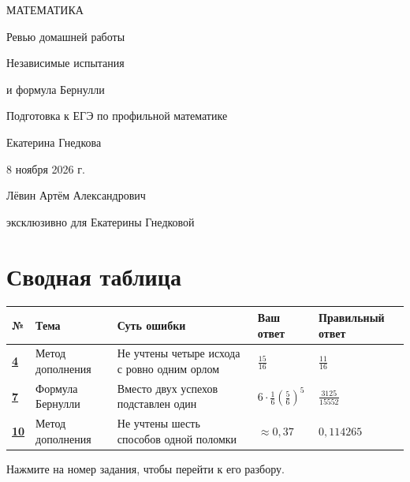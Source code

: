 \documentclass[a4paper,11pt]{article}
\newcommand{\reviewtitle}[1]{\section*{\color{darkaccent}#1}\vspace{-4pt}{\color{accent}\rule{\linewidth}{0.45pt}}\vspace{6pt}}
\begin{document}
\thispagestyle{empty}
\begin{titlepage}
\centering
\vspace*{25mm}
{\large\color{darkaccent}МАТЕМАТИКА\par}
\vspace{24mm}
{\LARGE Ревью домашней работы\par}
\vspace{15mm}
{\Large\color{accent}Независимые испытания\par}
{\Large\color{accent}и формула Бернулли\par}
\vspace{18mm}
{\normalsize Подготовка к ЕГЭ по профильной математике\par}
\vfill
{\large Екатерина Гнедкова\par}
\vspace{11mm}
{\normalsize 8 ноября 2026 г.\par}
\vspace{19mm}
{\small Лёвин Артём Александрович\par}
{\small эксклюзивно для Екатерины Гнедковой\par}
\vspace{18mm}
\end{titlepage}

\reviewtitle{Сводная таблица}
\noindent\small
\begin{tabularx}{\linewidth}{@{}>{\raggedright\arraybackslash}p{12mm}>{\raggedright\arraybackslash}p{27mm}>{\raggedright\arraybackslash}X>{\raggedright\arraybackslash}p{29mm}>{\raggedright\arraybackslash}p{30mm}@{}}
\toprule
\textbf{№} & \textbf{Тема} & \textbf{Суть ошибки} & \textbf{Ваш ответ} & \textbf{Правильный ответ}\\
\midrule
\hyperref[task:4]{\textcolor{darkaccent}{\textbf{4}}} & Метод дополнения & Не учтены четыре исхода с ровно одним орлом & $\displaystyle\frac{15}{16}$ & $\displaystyle\frac{11}{16}$\\
\addlinespace[4pt]
\hyperref[task:7]{\textcolor{darkaccent}{\textbf{7}}} & Формула Бернулли & Вместо двух успехов подставлен один & $6\cdot\frac16\left(\frac56\right)^5$ & $\displaystyle\frac{3125}{15552}$\\
\addlinespace[4pt]
\hyperref[task:10]{\textcolor{darkaccent}{\textbf{10}}} & Метод дополнения & Не учтены шесть способов одной поломки & $\approx 0{,}37$ & $0{,}114265$\\
\bottomrule
\end{tabularx}
\normalsize
\vspace{10pt}
\textcolor{muted}{Нажмите на номер задания, чтобы перейти к его разбору.}
\end{document}
